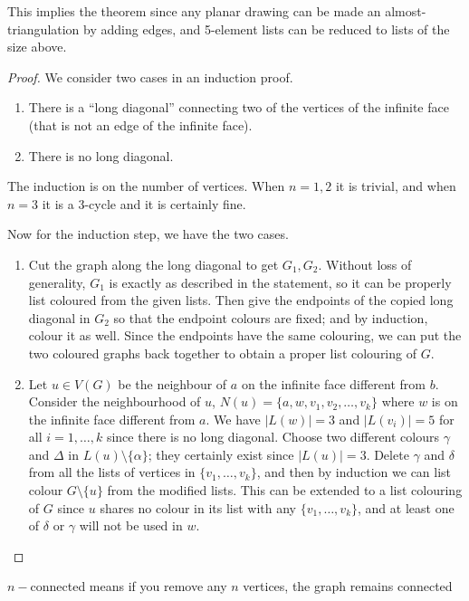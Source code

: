 \documentclass[11pt, a4paper]{memoir}
\theoremstyle{change}
\theoremstyle{plain}
\theoremstyle{nonumberplain}
\newtheorem{proof}{Proof}
\numberwithin{equation}{section}
\begin{document}
This implies the theorem since any planar drawing can be made an almost-triangulation by adding edges, and 5-element lists can be reduced to lists of the size above.
\begin{proof}
    We consider two cases in an induction proof.
    \begin{enumerate}[nolistsep]
        \item There is a ``long diagonal'' connecting two of the vertices of the infinite face (that is not an edge of the infinite face).
        \item There is no long diagonal.
    \end{enumerate}
    The induction is on the number of vertices.
    When $n=1,2$ it is trivial, and when $n=3$ it is a 3-cycle and it is certainly fine.

    Now for the induction step, we have the two cases.
    \begin{enumerate}
        \item Cut the graph along the long diagonal to get $G_1,G_2$.
            Without loss of generality, $G_1$ is exactly as described in the statement, so it can be properly list coloured from the given lists.
            Then give the endpoints of the copied long diagonal in $G_2$ so that the endpoint colours are fixed; and by induction, colour it as well.
            Since the endpoints have the same colouring, we can put the two coloured graphs back together to obtain a proper list colouring of $G$.
        \item Let $u\in V(G)$ be the neighbour of $a$ on the infinite face different from $b$.
            Consider the neighbourhood of $u$, $N(u)=\{a,w,v_1,v_2,\ldots,v_k\}$ where $w$ is on the infinite face different from $a$.
            We have $|L(w)|=3$ and $|L(v_i)|=5$ for all $i=1,\ldots,k$ since there is no long diagonal.
            Choose two different colours $\gamma$ and $\Delta$ in $L(u)\setminus\{\alpha\}$; they certainly exist since $|L(u)|=3$.
            Delete $\gamma$ and $\delta$ from all the lists of vertices in $\{v_1,\ldots,v_k\}$, and then by induction we can list colour $G\setminus\{u\}$ from the modified lists.
            This can be extended to a list colouring of $G$ since $u$ shares no colour in its list with any $\{v_1,\ldots,v_k\}$, and at least one of $\delta$ or $\gamma$ will not be used in $w$.
    \end{enumerate}
\end{proof}

$n-$connected means if you remove any $n$ vertices, the graph remains connected
\end{document}
